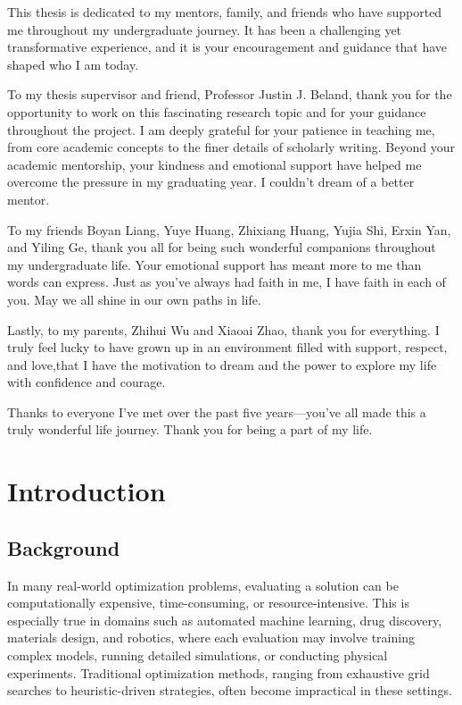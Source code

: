 \documentclass{ut-thesis}
\begin{document}
\begin{acknowledgements}
This thesis is dedicated to my mentors, family, and friends who have supported me throughout my undergraduate journey. It has been a challenging yet transformative experience, and it is your encouragement and guidance that have shaped who I am today.

To my thesis supervisor and friend, Professor Justin J. Beland, thank you for the opportunity to work on this fascinating research topic and for your guidance throughout the project. I am deeply grateful for your patience in teaching me, from core academic concepts to the finer details of scholarly writing. Beyond your academic mentorship, your kindness and emotional support have helped me overcome the pressure in my graduating year. I couldn't dream of a better mentor.

To my friends Boyan Liang, Yuye Huang, Zhixiang Huang, Yujia Shi, Erxin Yan, and Yiling Ge, thank you all for being such wonderful companions throughout my undergraduate life. Your emotional support has meant more to me than words can express. Just as you’ve always had faith in me, I have faith in each of you. May we all shine in our own paths in life.

Lastly, to my parents, Zhihui Wu and Xiaoai Zhao, thank you for everything. I truly feel lucky to have grown up in an environment filled with support, respect, and love,that I have the motivation to dream and the power to explore my life with confidence and courage. 

Thanks to everyone I’ve met over the past five years—you’ve all made this a truly wonderful life journey. Thank you for being a part of my life.

\end{acknowledgements}

{\footnotesize\setlength{\parskip}{10pt}\tableofcontents}

{\footnotesize\setlength{\parskip}{10pt}\listoffigures}

\clearpage


\chapter{Introduction}

\section{Background}

In many real-world optimization problems, evaluating a solution can be computationally expensive, time-consuming, or resource-intensive. This is especially true in domains such as automated machine learning, drug discovery, materials design, and robotics, where each evaluation may involve training complex models, running detailed simulations, or conducting physical experiments\cite{berkenkamp2023bayesian}\cite{zhang2020bayesian}\cite{8539993}. Traditional optimization methods, ranging from exhaustive grid searches to heuristic-driven strategies, often become impractical in these settings.
\end{document}
